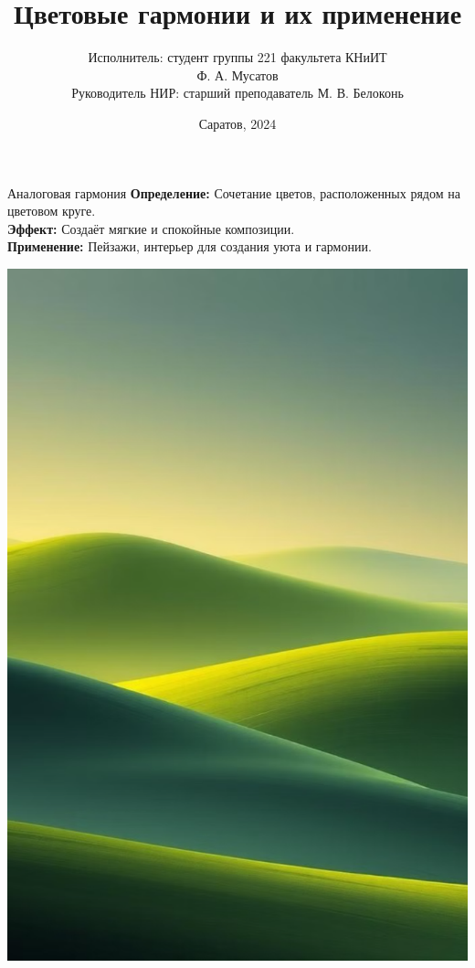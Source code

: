 \documentclass{beamer}
\title[Цветовые гармонии]{Цветовые гармонии и их применение}
\author[Ф. А. Мусатов]{Исполнитель: студент группы 221 факультета КНиИТ \\ Ф. А. Мусатов \\ Руководитель НИР: старший преподаватель М. В. Белоконь}
\institute[Саратов]{Саратовский государственный университет}
\date{Саратов, 2024}
\begin{document}
\begin{frame}
    \titlepage
\end{frame}

\begin{frame}{Аналоговая гармония}
    \textbf{Определение:} Сочетание цветов, расположенных рядом на цветовом круге. \\
    \vspace{0.3cm}
    \textbf{Эффект:} Создаёт мягкие и спокойные композиции. \\
    \vspace{0.3cm}
    \textbf{Применение:} Пейзажи, интерьер для создания уюта и гармонии.
    \begin{center}
        \includegraphics[width=0.6\linewidth]{analog_example.png} %
    \end{center}
\end{frame}
\end{document}

